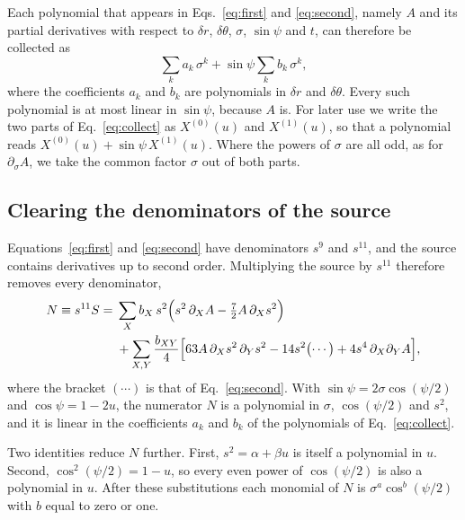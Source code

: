 \documentclass[11pt]{article}
\begin{document}
Each polynomial that appears in Eqs.~\eqref{eq:first} and \eqref{eq:second},
namely $A$ and its partial derivatives with respect to $\delta r$,
$\delta\theta$, $\sigma$, $\sin\psi$ and $t$, can therefore be collected as
\begin{equation}
  \label{eq:collect}
  \sum_k a_k\,\sigma^k + \sin\psi\sum_k b_k\,\sigma^k ,
\end{equation}
where the coefficients $a_k$ and $b_k$ are polynomials in $\delta r$ and
$\delta\theta$. Every such polynomial is at most linear in $\sin\psi$, because
$A$ is. For later use we write the two parts of Eq.~\eqref{eq:collect} as
$X^{(0)}(u)$ and $X^{(1)}(u)$, so that a polynomial reads
$X^{(0)}(u)+\sin\psi\,X^{(1)}(u)$. Where the powers of $\sigma$ are all odd,
as for $\partial_\sigma A$, we take the common factor $\sigma$ out of both
parts.

\subsection{Clearing the denominators of the source}
\label{sec:clear}

Equations~\eqref{eq:first} and \eqref{eq:second} have denominators $s^9$ and
$s^{11}$, and the source contains derivatives up to second order. Multiplying
the source by $s^{11}$ therefore removes every denominator,
\begin{equation}
  \label{eq:numerator}
  \begin{split}
  N \equiv s^{11}S ={}& \sum_X b_X\,s^2\Bigl(s^2\,\partial_X A - \tfrac72A\,\partial_X s^2\Bigr) \\
    &+ \sum_{X,Y}\frac{b_{XY}}{4}\Bigl[63A\,\partial_X s^2\,\partial_Y s^2
    - 14s^2\bigl(\cdots\bigr) + 4s^4\,\partial_X\partial_Y A\Bigr],
  \end{split}
\end{equation}
where the bracket $(\cdots)$ is that of Eq.~\eqref{eq:second}. With
$\sin\psi=2\sigma\cos(\psi/2)$ and $\cos\psi=1-2u$, the numerator $N$ is a
polynomial in $\sigma$, $\cos(\psi/2)$ and $s^2$, and it is linear in the
coefficients $a_k$ and $b_k$ of the polynomials of Eq.~\eqref{eq:collect}.

Two identities reduce $N$ further. First, $s^2=\alpha+\beta u$ is itself a
polynomial in $u$. Second, $\cos^2(\psi/2)=1-u$, so every even power of
$\cos(\psi/2)$ is also a polynomial in $u$. After these substitutions each
monomial of $N$ is $\sigma^a\cos^b(\psi/2)$ with $b$ equal to zero or one.
\end{document}
